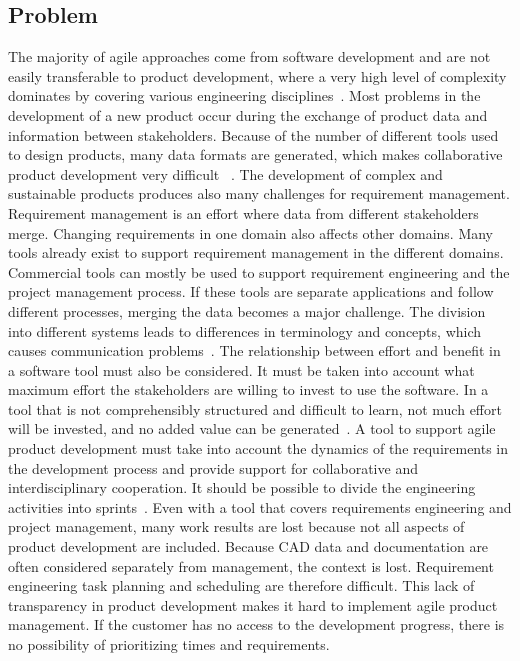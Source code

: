     
    
    \subsection*{Problem}
    The majority of agile approaches come from software development and are not easily transferable to product development, where a very high level of complexity dominates by covering various engineering disciplines~\cite{HEIMICKE2021786}.
    Most problems in the development of a new product occur during the exchange of product data and information between stakeholders. Because of the number of different tools used to design products, many data formats are generated, which makes collaborative product development very difficult ~\cite{houshmand2010collaborative}.
    The development of complex and sustainable products produces also many challenges for requirement management. Requirement management is an effort where data from different stakeholders merge. 
    Changing requirements in one domain also affects other domains. Many tools already exist to support requirement management in the different domains. Commercial tools can mostly be used to support requirement engineering and the project management process. If these tools are separate applications and follow different processes, merging the data becomes a major challenge. The division into different systems leads to differences in terminology and concepts, which causes communication problems~\cite{Jorma2014}.
    The relationship between effort and benefit in a software tool must also be considered. It must be taken into account what maximum effort the stakeholders are willing to invest to use the software. In a tool that is not comprehensibly structured and difficult to learn, not much effort will be invested, and no added value can be generated~\cite{RICHTER2020271}. A tool to support agile product development must take into account the dynamics of the requirements in the development process and provide support for collaborative and interdisciplinary cooperation. It should be possible to divide the engineering activities into sprints~\cite{liu2012scenario}.
    Even with a tool that covers requirements engineering and project management, many work results are lost because not all aspects of product development are included. Because CAD data and documentation are often considered separately from management, the context is lost. 
    Requirement engineering task planning and scheduling are therefore difficult.
    This lack of transparency in product development makes it hard to implement agile product management. If the customer has no access to the development progress, there is no possibility of prioritizing times and requirements. 

